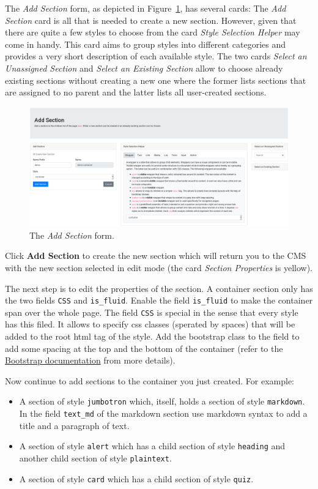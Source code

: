 \documentclass[a4paper,oneside]{book}
\begin{document}
The \emph{Add Section} form, as depicted in Figure~\ref{fig.add_section}, has several cards:
The \emph{Add Section} card is all that is needed to create a new section.
However, given that there are quite a few styles to choose from the card \emph{Style Selection Helper} may come in handy.
This card aims to group styles into different categories and provides a very short description of each available style.
The two cards \emph{Select an Unassigned Section} and \emph{Select an Existing Section} allow to choose already existing sections without creating a new one where the former lists sections that are assigned to no parent and the latter lists all user-created sections.

\begin{figure}[ht]
    \centering
    \includegraphics[width=\textwidth]{add_section.png}
    \caption{The \emph{Add Section} form.}
    \label{fig.add_section}
\end{figure}

Click \textbf{Add Section} to create the new section which will return you to the CMS with the new section selected in edit mode (the card \emph{Section Properties} is yellow).

The next step is to edit the properties of the section.
A container section only has the two fields \texttt{CSS} and \texttt{is\_fluid}.
Enable the field \texttt{is\_fluid} to make the container span over the whole page.
The field \texttt{CSS} is special in the sense that every style has this filed.
It allows to specify css classes (sperated by spaces) that will be added to the root html tag of the style.
Add the bootstrap class  to the field to add some spacing at the top and the bottom of the container (refer to the \href{https://getbootstrap.com/docs/4.1/utilities/spacing/}{Bootstrap documentation} from more details).

Now continue to add sections to the container you just created. For example:
\begin{itemize}
    \item A section of style \texttt{jumbotron} which, itself, holds a section of style \texttt{markdown}.
        In the field \texttt{text\_md} of the markdown section use markdown syntax to add a title and a paragraph of text.
    \item A section of style \texttt{alert} which has a child section of style \texttt{heading} and another child section of style \texttt{plaintext}.
    \item A section of style \texttt{card} which has a child section of style \texttt{quiz}.
\end{itemize}
\end{document}
